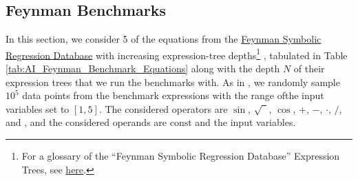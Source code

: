 \documentclass[runningheads]{llncs}
\newcommand\specialcaret{%
  \stackengine{0pt}{\ \,}{\scalebox{1.1}[2]{\raisebox{-0.9ex}{\string^}}}{O}{c}{F}{T}{L}}
\begin{document}
\subsection{Feynman Benchmarks} \label{subsec:FeynmanBenchmarks}
In this section, we consider 5 of the equations from the \href{https://space.mit.edu/home/tegmark/aifeynman.html}{Feynman Symbolic Regression Database} with increasing expression-tree depths\footnote{For a glossary of the ``Feynman Symbolic Regression Database'' Expression Trees, see \href{https://edfink234.github.io/AIFeynmanExpressionTrees/AIFeynmanExpressionTrees/AIFeynmanExpressionTrees}{here}.} 
, tabulated in Table \ref{tab:AI_Feynman_Benchmark_Equations} along with the depth $N$ of their expression trees that we run the benchmarks with. As in \cite{udrescu2020ai}, we randomly sample $10^5$ data points from the benchmark expressions with the range ofthe input variables set to $[1, 5]$. The considered operators are $\sin$, $\sqrt{\phantom{1}}$, $\cos$, $+$, $-$, $\cdot$, $/$, and \specialcaret, and the considered operands are $\mathrm{const}$ and the input variables. 
\end{document}

